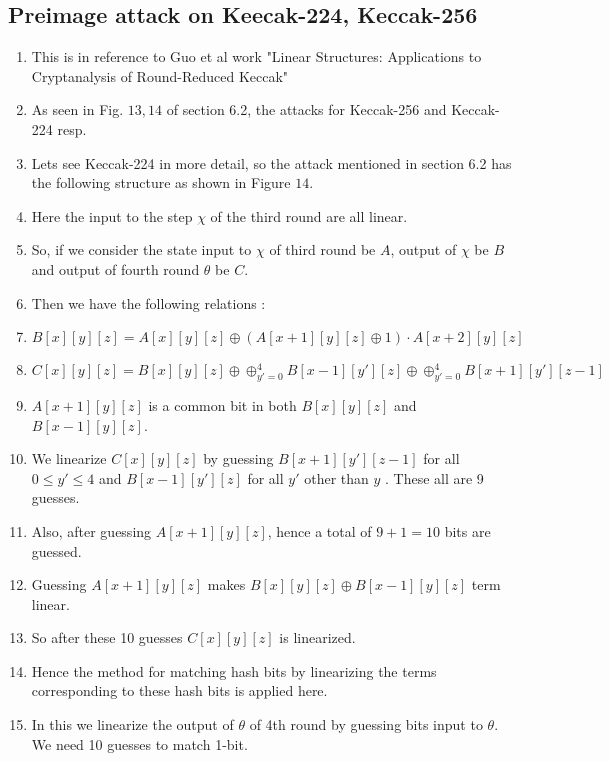 \documentclass{article}
\begin{document}
\subsection{Preimage attack on Keecak-224, Keccak-256}
\begin{enumerate}
    \item This is in reference to Guo et al work "Linear Structures: Applications to Cryptanalysis of Round-Reduced Keccak"
    \item As seen in Fig. $13, 14$ of section 6.2, the attacks for Keccak-256 and Keccak-224 resp.
    \item Lets see Keccak-224 in more detail, so the attack mentioned in section 6.2 has the following structure as shown in Figure $14$.
    \begin{figure}
        \label{fig:boat1}
    \end{figure}
    \item Here the input to the step $\chi$ of the third round are all linear.
    \item So, if we consider the state input to $\chi$ of third round be $A$, output of $\chi$ be $B$ and output of fourth round $\theta$ be $C$.
    
    \item Then we have the following relations : 
    \item \[
			B[x][y][z] = A[x][y][z] \oplus (A[x+1][y][z] \oplus 1) \cdot A[x+2][y][z]
		\]
	\item \[
        C[x][y][z] = B[x][y][z] \oplus \oplus_{y' = 0}^{4} B[x-1][y'][z] \oplus \oplus_{y' = 0}^{4} B[x+1][y'][z-1]
    \]
    \item $A[x+1][y][z]$ is a common bit in both $B[x][y][z]$ and $B[x-1][y][z]$.
    \item We linearize $C[x][y][z]$ by guessing $B[x+1][y'][z-1]$ for all $0 \leq y' \leq 4$ and $B[x-1][y'][z]$ for all $y'$ other than $y$ . These all are 9 guesses.
    \item Also, after guessing $A[x+1][y][z]$, hence a total of $9+1 = 10$ bits are guessed.
    \item Guessing $A[x+1][y][z]$ makes $B[x][y][z] \oplus B[x-1][y][z]$ term linear.
    \item So after these 10 guesses $C[x][y][z]$ is linearized.
    \item Hence the method for matching hash bits by linearizing the terms corresponding to these hash bits is applied here.
    \item In this we linearize the output of $\theta$ of 4th round by guessing bits input to $\theta$. We need 10 guesses to match 1-bit.
    

\end{enumerate}
\end{document}
